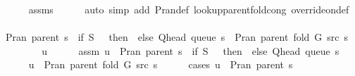\begin{isabellebody}
\ \ \ \ \isamarkupfalse%
\ assms\isanewline
\ \ \ \ \isamarkupfalse%
\ {\isacharparenleft}{\kern0pt}auto\ simp\ add{\isacharcolon}{\kern0pt}\ P{\isachardot}{\kern0pt}ran{\isacharunderscore}{\kern0pt}def\ lookup{\isacharunderscore}{\kern0pt}parent{\isacharunderscore}{\kern0pt}fold{\isacharunderscore}{\kern0pt}cong{\isacharunderscore}{\kern0pt}{}\ override{\isacharunderscore}{\kern0pt}on{\isacharunderscore}{\kern0pt}def{\isacharparenright}{\kern0pt}\isanewline
\ \ \isamarkupfalse%
\ {\isachardoublequoteopen}P{\isachardot}{\kern0pt}ran\ {\isacharparenleft}{\kern0pt}parent\ s{\isacharparenright}{\kern0pt}\ {\isasymunion}\ {\isacharparenleft}{\kern0pt}if\ {\isacharquery}{\kern0pt}S\ {\isacharequal}{\kern0pt}\ {\isacharbraceleft}{\kern0pt}{\isacharbraceright}{\kern0pt}\ then\ {\isacharbraceleft}{\kern0pt}{\isacharbraceright}{\kern0pt}\ else\ {\isacharbraceleft}{\kern0pt}Q{\isacharunderscore}{\kern0pt}head\ {\isacharparenleft}{\kern0pt}queue\ s{\isacharparenright}{\kern0pt}{\isacharbraceright}{\kern0pt}{\isacharparenright}{\kern0pt}\ {\isasymsubseteq}\ P{\isachardot}{\kern0pt}ran\ {\isacharparenleft}{\kern0pt}parent\ {\isacharparenleft}{\kern0pt}fold\ G\ src\ s{\isacharparenright}{\kern0pt}{\isacharparenright}{\kern0pt}{\isachardoublequoteclose}\isanewline
\ \ \isamarkupfalse%
\isanewline
\ \ \ \ \isamarkupfalse%
\ u\isanewline
\ \ \ \ \isamarkupfalse%
\ assm{\isacharcolon}{\kern0pt}\ {\isachardoublequoteopen}u\ {\isasymin}\ P{\isachardot}{\kern0pt}ran\ {\isacharparenleft}{\kern0pt}parent\ s{\isacharparenright}{\kern0pt}\ {\isasymunion}\ {\isacharparenleft}{\kern0pt}if\ {\isacharquery}{\kern0pt}S\ {\isacharequal}{\kern0pt}\ {\isacharbraceleft}{\kern0pt}{\isacharbraceright}{\kern0pt}\ then\ {\isacharbraceleft}{\kern0pt}{\isacharbraceright}{\kern0pt}\ else\ {\isacharbraceleft}{\kern0pt}Q{\isacharunderscore}{\kern0pt}head\ {\isacharparenleft}{\kern0pt}queue\ s{\isacharparenright}{\kern0pt}{\isacharbraceright}{\kern0pt}{\isacharparenright}{\kern0pt}{\isachardoublequoteclose}\isanewline
\ \ \ \ \isamarkupfalse%
\ {\isachardoublequoteopen}u\ {\isasymin}\ P{\isachardot}{\kern0pt}ran\ {\isacharparenleft}{\kern0pt}parent\ {\isacharparenleft}{\kern0pt}fold\ G\ src\ s{\isacharparenright}{\kern0pt}{\isacharparenright}{\kern0pt}{\isachardoublequoteclose}\isanewline
\ \ \ \ \isamarkupfalse%
\ {\isacharparenleft}{\kern0pt}cases\ {\isachardoublequoteopen}u\ {\isasymin}\ P{\isachardot}{\kern0pt}ran\ {\isacharparenleft}{\kern0pt}parent\ s{\isacharparenright}{\kern0pt}{\isachardoublequoteclose}{\isacharparenright}{\kern0pt}\isanewline

\end{isabellebody}
